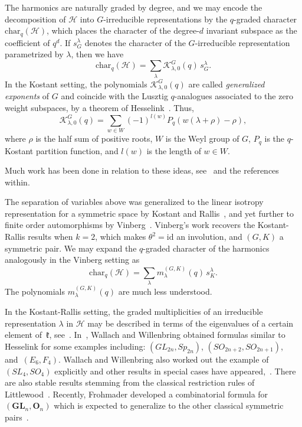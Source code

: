 \documentclass[11pt]{article}
\theoremstyle{definition}
\numberwithin{equation}{section}
\newcommand{\GL}{\textbf{GL}}
\newcommand{\Or}{\textbf{O}}
\begin{document}
The harmonics are naturally graded by degree, and we may encode the decomposition of $\mathcal{H}$ into $G$-irreducible representations by the $q$-graded character $\text{char}_q(\mathcal{H})$, which places the character of the degree-$d$ invariant subspace as the coefficient of $q^d$. If $s^\lambda_G$ denotes the character of the $G$-irreducible representation parametrized by $\lambda$, then we have
\begin{equation*}
    \text{char}_q(\mathcal{H}) = \sum_\lambda \mathcal{K}^G_{\lambda,0}(q) \, s^\lambda_G.
\end{equation*}
In the Kostant setting, the polynomials $\mathcal{K}^G_{\lambda,0}(q)$ are called \textit{generalized exponents} of $G$ and coincide with the Lusztig $q$-analogues associated to the zero weight subspaces, by a theorem of Hesselink~\cite{Hesselink1980}. Thus,
\begin{equation*}
    \mathcal{K}_{\lambda,0}^G(q) = \sum_{w \in W} (-1)^{l(w)}P_q(w(\lambda + \rho)-\rho),
\end{equation*}
where $\rho$ is the half sum of positive roots, $W$ is the Weyl group of $G$, $P_q$ is the $q$-Kostant partition function, and $l(w)$ is the length of $w \in W$.

Much work has been done in relation to these ideas, see~\cite{KwonJang2021, LecouveyLenart2020, NelsenRam2003} and the references within.

The separation of variables above was generalized to the linear isotropy representation for a symmetric space by Kostant and Rallis~\cite{KostantRallis1971}, and yet further to finite order automorphisms by Vinberg~\cite{Vinberg1976}. Vinberg's work recovers the Kostant-Rallis results when $k=2$, which makes $\theta^2 = \text{id}$ an involution, and $(G,K)$ a symmetric pair. We may expand the $q$-graded character of the harmonics analogously in the Vinberg setting as
\begin{equation*}
    \text{char}_q(\mathcal{H}) = \sum_\lambda m^{(G,K)}_{\lambda}(q) \, s^\lambda_K.
\end{equation*}
The polynomials $m^{(G,K)}_{\lambda}(q)$ are much less understood. 

In the Kostant-Rallis setting, the graded multiplicities of an irreducible representation $\lambda$ in $\mathcal{H}$ may be described in terms of the eigenvalues of a certain element of~$\mathfrak{k}$, see~\cite[Theorem 21]{KostantRallis1971}. In~\cite{WallachWillenbring2000}, Wallach and Willenbring obtained formulas similar to Hesselink for some examples including: $(GL_{2n}, Sp_{2n})$, $(SO_{2n+2},SO_{2n+1})$, and~$(E_6, F_4)$. Wallach and Willenbring also worked out the example of $(SL_4, SO_4)$ explicitly and other results in special cases have appeared,~\cite{WillenbringVanGroningen2014, JohnsonWallach1977}. There are also stable results stemming from the classical restriction rules of Littlewood~\cite{HoweTanWillenbring2005, HoweTanWillenbring2008, Littlewood1944, Littlewood1945, Willenbring2002}. Recently, Frohmader developed a combinatorial formula for $(\GL_n, \Or_n)$ which is expected to generalize to the other classical symmetric pairs~\cite{frohmader2023graded}. 
\end{document}
